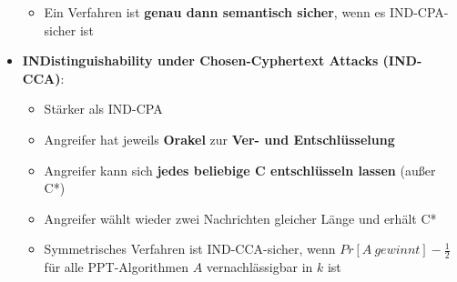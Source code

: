 \begin{itemize}
\begin{itemize}
		\item Ein Verfahren ist \textbf{genau dann semantisch sicher}, wenn es IND-CPA-sicher ist
	\end{itemize}
	\item \textbf{INDistinguishability under Chosen-Cyphertext Attacks (IND-CCA)}:
	\begin{itemize}
		\item Stärker als IND-CPA
		\item Angreifer hat jeweils \textbf{Orakel} zur \textbf{Ver- und Entschlüsselung}
		\item Angreifer kann sich \textbf{jedes beliebige C entschlüsseln lassen} (außer C*)
		\item Angreifer wählt wieder zwei Nachrichten gleicher Länge und erhält C*
		\item Symmetrisches Verfahren ist IND-CCA-sicher, wenn $Pr[A\ gewinnt] - \frac{1}{2}$ für alle PPT-Algorithmen $A$ vernachlässigbar in $k$ ist
	\end{itemize}
\end{itemize}